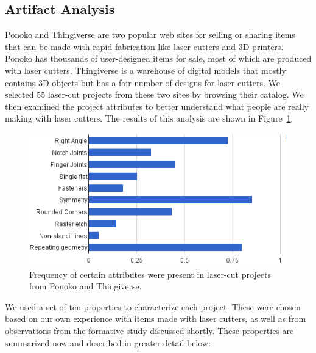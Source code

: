 \documentclass{article}
\begin{document}
\subsection{Artifact Analysis}

Ponoko and Thingiverse are two popular web sites for selling or
sharing items that can be made with rapid fabrication like laser
cutters and 3D printers. Ponoko has thousands of user-designed items
for sale, most of which are produced with laser cutters. Thingiverse
is a warehouse of digital models that mostly contains 3D objects but
has a fair number of designs for laser cutters. We selected 55
laser-cut projects from these two sites by browsing their catalog. We
then examined the project attributes to better understand what people are
really making with laser cutters. The results of this analysis are
shown in Figure~\ref{fig:ponoko}.

\begin{figure}[h]
  \includegraphics[width=0.9\linewidth]{img/ponoko-analysis.png}
  \caption{Frequency of certain attributes were present in laser-cut
    projects from Ponoko and Thingiverse.}
  \label{fig:ponoko}
\end{figure}

We used a set of ten properties to characterize each project. These
were chosen based on our own experience with items made with laser
cutters, as well as from observations from the formative study
discussed shortly. These properties are summarized now and described
in greater detail below:
\end{document}
